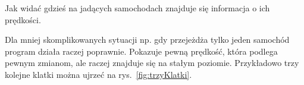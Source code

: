 \documentclass[11pt, a4paper]{article}
\begin{document}
Jak widać gdzieś na jadących samochodach znajduje się informacja o ich prędkości.

Dla mniej skomplikowanych sytuacji np. gdy przejeżdża tylko jeden samochód program działa raczej poprawnie. Pokazuje pewną prędkość, która podlega pewnym zmianom, ale raczej znajduje się na stałym poziomie. Przykładowo trzy kolejne klatki można ujrzeć na rys.~\ref{fig:trzyKlatki}.
\begin{figure}[htbp!]
	\centering
	
	\hfill%
	\hfill%
	\subfloat[]{%
}
\end{figure}
\end{document}
